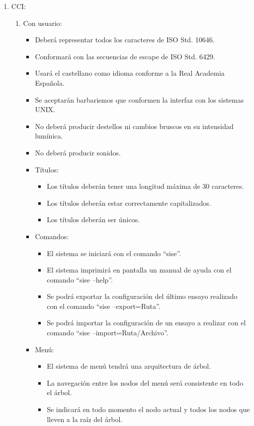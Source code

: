 \documentclass[
11pt, %
]{charter}
\begin{document}
\begin{enumerate}
	\item CCI:
	\begin{enumerate}
		\item Con usuario:
		\begin{itemize}
			\item Deberá representar todos los caracteres de ISO Std. 10646.
			\item Conformará con las secuencias de escape de ISO Std. 6429.
			\item Usará el castellano como idioma conforme a la Real Academia Española.
			\item Se aceptarán barbarismos que conformen la interfaz con los sistemas UNIX.
			\item No deberá producir destellos ni cambios bruscos en su intensidad lumínica.
			\item No deberá producir sonidos.
			\item Títulos:
			\begin{itemize}
				\item Los títulos deberán tener una longitud máxima de 30 caracteres.
				\item Los títulos deberán estar correctamente capitalizados.
				\item Los títulos deberán ser únicos.
			\end{itemize}
			\item Comandos:
			\begin{itemize}
				\item El sistema se iniciará con el comando ``sise''.
				\item El sistema imprimirá en pantalla un manual de ayuda con el comando ``sise --help''.
				\item Se podrá exportar la configuración del último ensayo realizado con el comando ``sise --export=Ruta''.
				\item Se podrá importar la configuración de un ensayo a realizar con el comando ``sise --import=Ruta/Archivo''.
			\end{itemize}
			\item Menú:
			\begin{itemize}
				\item El sistema de menú tendrá una arquitectura de árbol.
				\item La navegación entre los nodos del menú será consistente en todo el árbol.
				\item Se indicará en todo momento el nodo actual y todos los nodos que lleven a la raíz del árbol.

\end{itemize}
\end{itemize}
\end{enumerate}
\end{enumerate}
\end{document}
